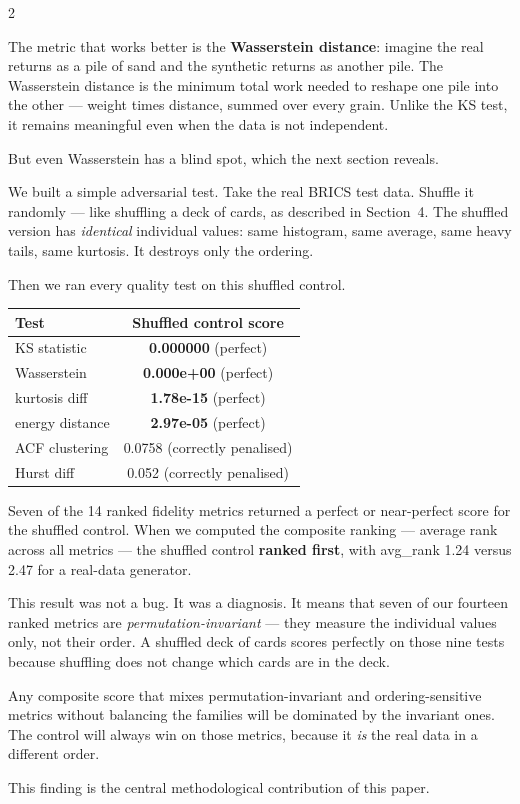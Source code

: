 \documentclass[10pt]{article}
\newcommand{\redbox}[2]{\begin{tcolorbox}[mybox={DRed}{RBg},title={#1}]#2\end{tcolorbox}}
\begin{document}
\begin{multicols}{2}
{The metric that works better is the \textbf{Wasserstein distance}: imagine the real returns as a pile of sand and the synthetic returns as another pile. The Wasserstein distance is the minimum total work needed to reshape one pile into the other --- weight times distance, summed over every grain. Unlike the KS test, it remains meaningful even when the data is not independent.

But even Wasserstein has a blind spot, which the next section reveals.}

\columnbreak

\redbox{7\quad The Shuffled Deck --- What We Discovered}{%
We built a simple adversarial test. Take the real BRICS test data. Shuffle it randomly --- like shuffling a deck of cards, as described in Section~4. The shuffled version has \emph{identical} individual values: same histogram, same average, same heavy tails, same kurtosis. It destroys only the ordering.

Then we ran every quality test on this shuffled control.

\medskip
\begin{tabular}{@{}lc@{}}
\toprule
Test & Shuffled control score \\
\midrule
KS statistic   & \textbf{0.000000} (perfect) \\
Wasserstein    & \textbf{0.000e+00} (perfect) \\
kurtosis diff  & \textbf{1.78e-15} (perfect) \\
energy distance & \textbf{2.97e-05} (perfect) \\
\midrule
ACF clustering & 0.0758 (correctly penalised) \\
Hurst diff     & 0.052 (correctly penalised) \\
\bottomrule
\end{tabular}

\medskip
Seven of the 14 ranked fidelity metrics returned a perfect or near-perfect score for the shuffled control. When we computed the composite ranking --- average rank across all metrics --- the shuffled control \textbf{ranked first}, with avg\_rank 1.24 versus 2.47 for a real-data generator.

This result was not a bug. It was a diagnosis. It means that seven of our fourteen ranked metrics are \emph{permutation-invariant} --- they measure the individual values only, not their order. A shuffled deck of cards scores perfectly on those nine tests because shuffling does not change which cards are in the deck.

Any composite score that mixes permutation-invariant and ordering-sensitive metrics without balancing the families will be dominated by the invariant ones. The control will always win on those metrics, because it \emph{is} the real data in a different order.

\smallskip
This finding is the central methodological contribution of this paper.}

\end{multicols}
\end{document}

